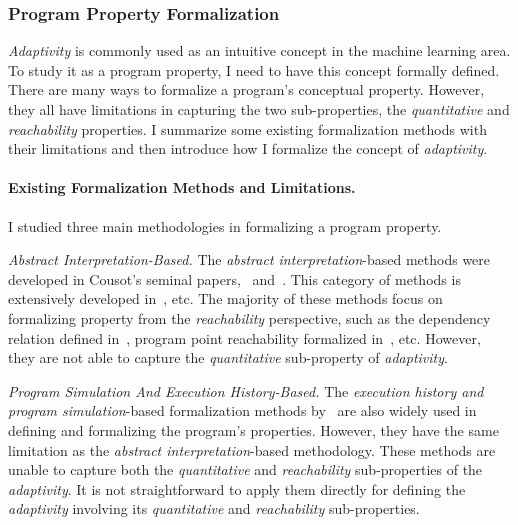 \subsubsection{Program Property Formalization}
\label{sec:intro-methodology-adapt-formalization}
\emph{Adaptivity} is commonly used as an intuitive concept in the
machine learning area.
To study it as a program property, I need to have 
this concept 
formally defined.
There are many ways to formalize a program's conceptual property. However, they all have limitations in capturing the two sub-properties, the \emph{quantitative} and \emph{reachability} properties. 
I summarize some existing formalization methods with their limitations and then introduce how I formalize the concept of \emph{adaptivity}.

\paragraph{Existing Formalization Methods and Limitations.}
I studied
three main methodologies
in formalizing a program property.

\emph{{Abstract Interpretation}-Based.}
The \emph{abstract interpretation}-based methods were developed in Cousot's seminal papers,~\cite{CousotH78} and~\cite{CousotC77}.
This category of methods is extensively developed 
in~\cite{Mine06, ZanioliC11, MastroeniZ17, KincaidCBR18, Cousot19a, JanaHAGC20}, etc. 
The majority of these methods focus on formalizing property from the \emph{reachability} perspective,
such as the dependency relation defined in~\cite{Cousot19a}, program point reachability formalized in~\cite{MastroeniZ08}, etc.
However, they are not able to capture the \emph{quantitative} sub-property of \emph{adaptivity}.

\emph{Program Simulation And Execution History-Based.} 
The \emph{execution history and program simulation}-based formalization methods by~\cite{Israel56, Kildall73}
are also widely used in defining
and formalizing the program's properties.
However, they have the same limitation as the \emph{abstract interpretation}-based methodology. 
These methods are unable to capture both the \emph{quantitative} and \emph{reachability} sub-properties of
the \emph{adaptivity}. It is not straightforward to apply them directly for defining the \emph{adaptivity}
involving its \emph{quantitative} and \emph{reachability} sub-properties. 


